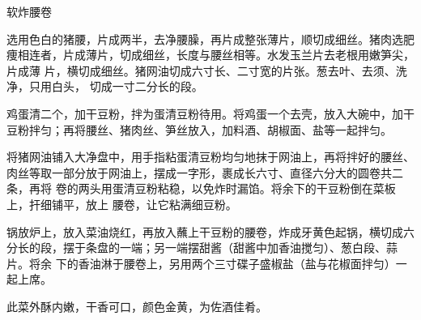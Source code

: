 \begin{recipe}{软炸腰卷}

\ingredients


\preparation

\step 选用色白的猪腰，片成两半，去净腰臊，再片成整张薄片，顺切成细丝。猪肉选肥
痩相连者，片成薄片，切成细丝，长度与腰丝相等。水发玉兰片去老根用嫩笋尖，片成薄
片，横切成细丝。猪网油切成六寸长、二寸宽的片张。葱去叶、去须、洗净，只用白头，
切成一寸二分长的段。

\step 鸡蛋清二个，加干豆粉，拌为蛋清豆粉待用。将鸡蛋一个去壳，放入大碗中，加干
豆粉拌匀；再将腰丝、猪肉丝、笋丝放入，加料酒、胡椒面、盐等一起拌匀。

\step 将猪网油铺入大净盘中，用手指粘蛋清豆粉均匀地抹于网油上，再将拌好的腰丝、
肉丝等取一部分放于网油上，摆成一字形，裹成长六寸、直径六分大的圆卷共二条，再将
卷的两头用蛋清豆粉粘稳，以免炸时漏馅。将余下的干豆粉倒在菜板上，扞细铺平，放上
腰卷，让它粘满细豆粉。

\step 锅放炉上，放入菜油烧红，再放入蘸上干豆粉的腰卷，炸成牙黄色起锅，横切成六
分长的段，摆于条盘的一端；另一端摆甜酱（甜酱中加香油搅匀）、葱白段、蒜片。将余
下的香油淋于腰卷上，另用两个三寸碟子盛椒盐（盐与花椒面拌匀）一起上席。

\features

此菜外酥内嫩，干香可口，颜色金黄，为佐酒佳肴。

\end{recipe}

